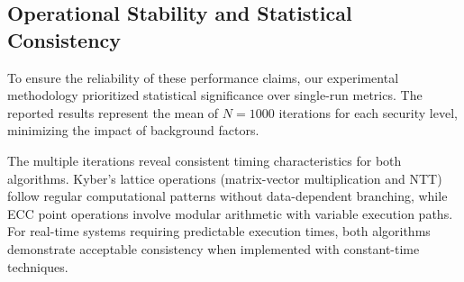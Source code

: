 \subsection{Operational Stability and Statistical Consistency}

To ensure the reliability of these performance claims, our experimental methodology prioritized statistical significance over single-run metrics. The reported results represent the mean of $N=1000$ iterations for each security level, minimizing the impact of background factors.

The multiple iterations reveal consistent timing characteristics for both algorithms. Kyber's lattice operations (matrix-vector multiplication and NTT) follow regular computational patterns without data-dependent branching, while ECC point operations involve modular arithmetic with variable execution paths. For real-time systems requiring predictable execution times, both algorithms demonstrate acceptable consistency when implemented with constant-time techniques.